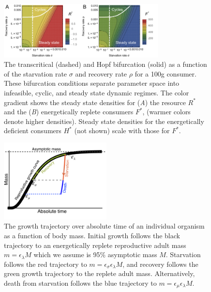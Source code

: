 \documentclass{pnastwo}
\begin{document}
\begin{figure}
\centering
\includegraphics[width=0.75\textwidth]{fig_FixedPoint.pdf}
\caption{ The transcritical (dashed) and Hopf bifurcation (solid) as a
  function of the starvation rate $\sigma$ and recovery rate $\rho$ for a 100g consumer.  These
  bifurcation conditions separate parameter space into infeasible, cyclic,
  and steady state dynamic regimes.  The color gradient shows the steady
  state densities for (\emph{A}) the resource $R^*$ and the (\emph{B}) energetically
  replete consumers $F^*$, (warmer colors denote higher densities).  Steady
  state densities for the energetically deficient consumers $H^*$ (not shown)
  scale with those for $F^*$.  }
\label{fig:fp}
\end{figure}


\begin{figure}
\centering
\includegraphics[width=0.5\textwidth]{Growth-trajectory-diagram.pdf}
\caption{ The growth trajectory over absolute time of an individual organism
  as a function of body mass.  Initial growth follows the black trajectory to
  an energetically replete reproductive adult mass $m=\epsilon_\lambda M$ which we assume is 95\% asymptotic mass $M$.  Starvation follows the red
  trajectory to $m = \epsilon_\sigma \epsilon_\lambda  M$, and recovery follows the
  green growth trajectory to the replete adult mass. Alternatively, death from starvation follows the blue trajectory to $m=\epsilon_\mu \epsilon_\lambda  M$.}
\label{fig:growth}
\end{figure}
\end{document}
